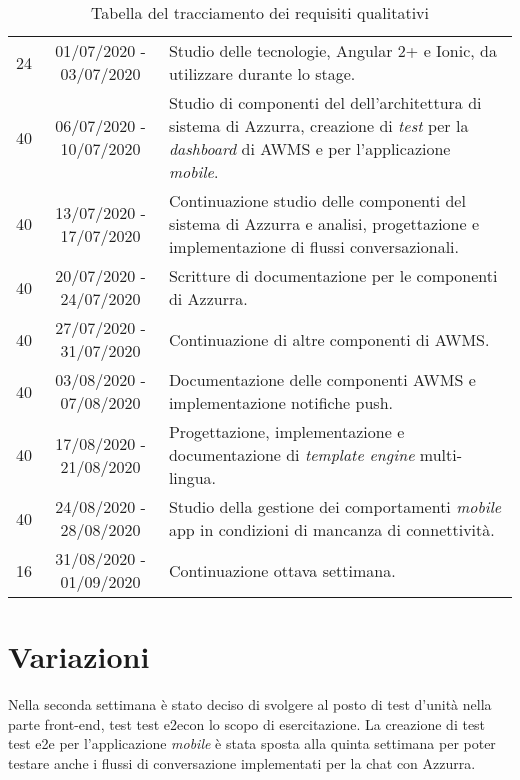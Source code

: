 \begin{table}[h]%
	\centering
\begin{tabularx}{\textwidth}{c c X}
	\hline	
	\rowcolor{giallo}
	 \intest{Durata in ore} &  \intest{Data inizio - fine} & \intest{Attività}\\	
	\hline			
	24 &  01/07/2020 - 03/07/2020 & Studio delle tecnologie, Angular 2+ e Ionic, da utilizzare durante lo stage.\\

	40 &  06/07/2020 - 10/07/2020 & Studio di componenti del dell'architettura di sistema di Azzurra, creazione di \emph{test} per la \emph{dashboard} di \gls{AWMS} e per l'applicazione \emph{mobile}. \\

	40 &  13/07/2020 - 17/07/2020 & Continuazione studio delle componenti del sistema di Azzurra e analisi, progettazione e implementazione di flussi conversazionali.\\

	40 &  20/07/2020 - 24/07/2020 & Scritture di documentazione per le componenti di Azzurra.\\

	40 &  27/07/2020 - 31/07/2020 & Continuazione di altre componenti di \gls{AWMS}.\\

	40 &  03/08/2020 - 07/08/2020 & Documentazione delle componenti \gls{AWMS} e implementazione notifiche push.\\

	40 &  17/08/2020 - 21/08/2020 & Progettazione, implementazione e documentazione di \emph{template engine} multi-lingua.\\

	40 &  24/08/2020 - 28/08/2020 & Studio della gestione dei comportamenti \emph{mobile} app in condizioni di mancanza di connettività.\\

	16 &  31/08/2020 - 01/09/2020 & Continuazione ottava settimana. \\
	\hline
\end{tabularx} \hbox{}

\caption{Tabella del tracciamento dei requisiti qualitativi}
\end{table}%

\section{Variazioni}
Nella seconda settimana è stato deciso di svolgere al posto di test d'unità nella parte front-end, test \gls{test e2e}\glsfirstoccur con lo scopo di esercitazione. La creazione di test \gls{test e2e}\ap{[g]} per l'applicazione \emph{mobile} è stata sposta alla quinta settimana per poter testare anche i flussi di conversazione implementati per la chat con Azzurra.

